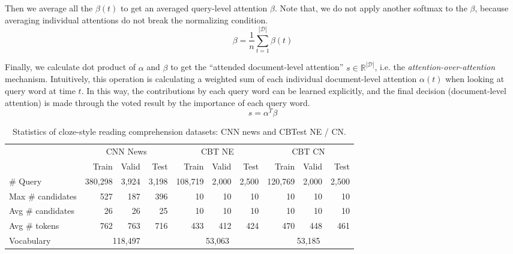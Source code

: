 \documentclass[11pt,a4paper]{article}
\begin{document}
Then we average all the $\beta(t)$ to get an averaged query-level attention $\beta$. Note that, we do not apply another softmax to the $\beta$, because averaging individual attentions do not break the normalizing condition.
\begin{equation} \beta = \frac{1}{n}\sum\limits_{t=1}^{|\mathcal D|}\beta(t) \end{equation}

Finally, we calculate dot product of $\alpha$ and $\beta$ to get the ``attended document-level attention'' $s\in\mathbb{R}^{|\mathcal D|}$, i.e. the {\em attention-over-attention} mechanism. 
Intuitively, this operation is calculating a weighted sum of each individual document-level attention $\alpha(t)$ when looking at query word at time $t$.
In this way, the contributions by each query word can be learned explicitly, and the final decision (document-level attention) is made through the voted result by the importance of each query word.
\begin{equation} s = \alpha^{T} \beta  \end{equation}

        \begin{table*}[htbp]
        \begin{center}
        \begin{tabular}{lrrrrrrrrr}
        \toprule
        & \multicolumn{3}{c}{CNN News} & \multicolumn{3}{c}{CBT NE} & \multicolumn{3}{c}{CBT CN} \\
        & Train & Valid & Test & Train & Valid & Test & Train & Valid & Test \\
        \midrule
        \# Query & 380,298 & 3,924 & 3,198 & 108,719 & 2,000 & 2,500 & 120,769 & 2,000 & 2,500 \\
        Max \# candidates & 527 & 187 & 396 & 10 & 10 & 10 & 10 & 10 & 10 \\
        Avg \# candidates & 26 & 26 & 25 & 10 & 10 & 10 & 10 & 10 & 10 \\
        Avg \# tokens & 762 & 763 & 716 & 433 & 412 & 424 & 470 & 448 & 461 \\
        Vocabulary & \multicolumn{3}{c}{118,497} & \multicolumn{3}{c}{53,063} & \multicolumn{3}{c}{53,185}\\
        \bottomrule
        \end{tabular}
        \end{center}
        \caption{\label{cbt-stats} Statistics of cloze-style reading comprehension datasets: CNN news and CBTest NE / CN.}
        \end{table*}
\end{document}
